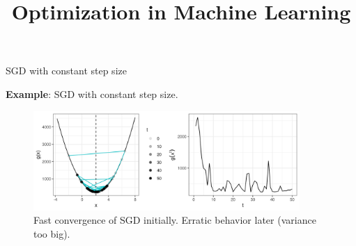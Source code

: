 \documentclass[11pt,compress,t,notes=noshow, xcolor=table]{beamer}
\title{Optimization in Machine Learning}
\date{}
\begin{document}
\sloppy


\begin{vbframe}{SGD with constant step size}

\textbf{Example}: SGD with constant step size. 

\begin{figure}
    \centering
    \includegraphics[width=0.9\textwidth]{figure_man/sgd_example_erratic_behavior.png}
    \caption*{Fast convergence of SGD initially.
        Erratic behavior later (variance too big).}
\end{figure}

\end{vbframe}
\end{document}
